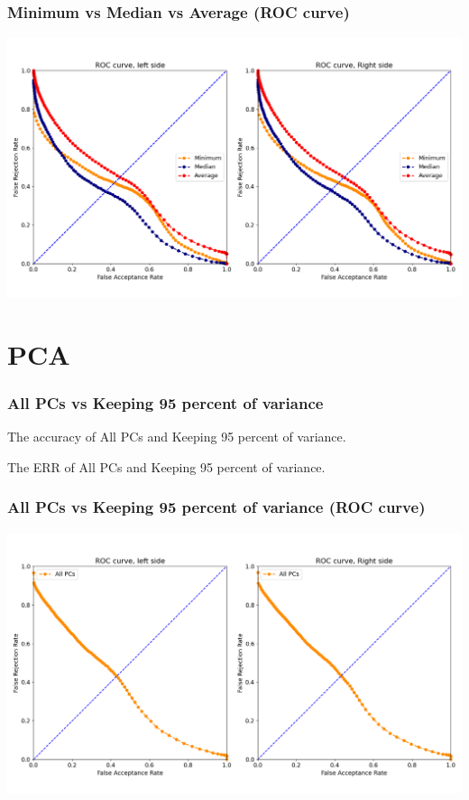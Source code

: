 \documentclass{beamer}
\begin{document}
\begin{frame}
\centering
\frametitle{Minimum vs Median vs Average (ROC curve)}
\includegraphics[scale=0.3]{Manuscripts/src/figures/Minimum.png}
\end{frame}


\section{PCA}

\begin{frame}
\frametitle{All PCs vs Keeping 95 percent of variance}
\tiny
\begin{table}
\centering
\captionsetup{labelformat=empty}
\caption{\small The accuracy of All PCs and Keeping 95 percent of variance.}
\label{tab:parameters condition}

\end{table}
\begin{table}
\centering
\captionsetup{labelformat=empty}
\caption{\small The ERR of All PCs and Keeping 95 percent of variance.}
\label{tab:parameters condition}

\end{table}
\end{frame}


\begin{frame}
\centering
\frametitle{All PCs vs Keeping 95 percent of variance (ROC curve)}
\includegraphics[scale=0.3]{Manuscripts/src/figures/PCA.png}
\end{frame}
\end{document}
